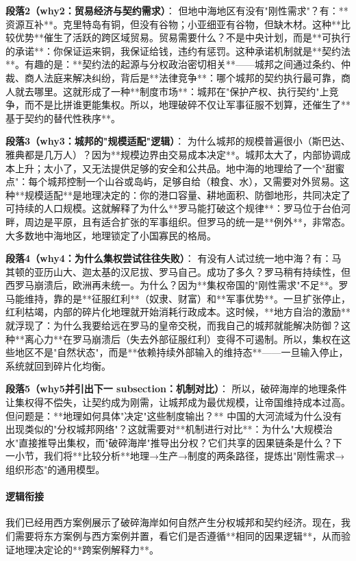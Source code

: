 \documentclass[openany, a4paper, 12pt]{book}
\begin{document}
	\textbf{段落2（why2：贸易经济与契约需求）}：  
	但地中海地区有没有"刚性需求"？有：**资源互补**。克里特岛有铜，但没有谷物；小亚细亚有谷物，但缺木材。这种**比较优势**催生了活跃的跨区域贸易。贸易需要什么？不是中央计划，而是**可执行的承诺**：你保证运来铜，我保证给钱，违约有惩罚。这种承诺机制就是**契约法**。有趣的是：**契约法的起源与分权政治密切相关**——城邦之间通过条约、仲裁、商人法庭来解决纠纷，背后是**法律竞争**：哪个城邦的契约执行最可靠，商人就去哪里。这就形成了一种**制度市场**：城邦在"保护产权、执行契约"上竞争，而不是比拼谁更能集权。所以，地理破碎不仅让军事征服不划算，还催生了**基于契约的替代性秩序**。
	
	\textbf{段落3（why3：城邦的"规模适配"逻辑）}：  
	为什么城邦的规模普遍很小（斯巴达、雅典都是几万人）？因为**规模边界由交易成本决定**。城邦太大了，内部协调成本上升；太小了，又无法提供足够的安全和公共品。地中海的地理给了一个"甜蜜点"：每个城邦控制一个山谷或岛屿，足够自给（粮食、水），又需要对外贸易。这种**规模适配**是地理决定的：你的港口容量、耕地面积、防御地形，共同决定了可持续的人口规模。这就解释了为什么**罗马能打破这个规律**：罗马位于台伯河畔，周边是平原，且有适合扩张的军事组织。但罗马的统一是**例外**，非常态。大多数地中海地区，地理锁定了小国寡民的格局。
	
	\textbf{段落4（why4：为什么集权尝试往往失败）}：  
	有没有人试过统一地中海？有：马其顿的亚历山大、迦太基的汉尼拔、罗马自己。成功了多久？罗马稍有持续性，但西罗马崩溃后，欧洲再未统一。为什么？因为**集权帝国的"刚性需求"不足**。罗马能维持，靠的是**征服红利**（奴隶、财富）和**军事优势**。一旦扩张停止，红利枯竭，内部的碎片化地理就开始消耗行政成本。这时候，**地方自治的激励**就浮现了：为什么我要给远在罗马的皇帝交税，而我自己的城邦就能解决防御？这种**离心力**在罗马崩溃后（失去外部征服红利）变得不可遏制。所以，集权在这些地区不是"自然状态"，而是**依赖持续外部输入的维持态**——一旦输入停止，系统就回到碎片化均衡。
	
	\textbf{段落5（why5并引出下一 subsection：机制对比）}：  
	所以，破碎海岸的地理条件让集权得不偿失，让契约成为刚需，让城邦成为最优规模，让帝国维持成本过高。但问题是：**地理如何具体"决定"这些制度输出？** 中国的大河流域为什么没有出现类似的"分权城邦网络"？这就需要对**机制进行对比**：为什么"大规模治水"直接推导出集权，而"破碎海岸"推导出分权？它们共享的因果链条是什么？下一小节，我们将**比较分析**地理→生产→制度的两条路径，提炼出"刚性需求→组织形态"的通用模型。
	
	\paragraph*{逻辑衔接}
	我们已经用西方案例展示了破碎海岸如何自然产生分权城邦和契约经济。现在，我们需要将东方案例与西方案例并置，看它们是否遵循**相同的因果逻辑**，从而验证地理决定论的**跨案例解释力**。
	
\end{document}

